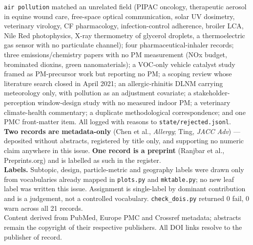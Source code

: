 \documentclass[10pt]{article}
\begin{document}
\begin{keybox}
{\texttt{air pollution} matched an unrelated field (PIPAC oncology, therapeutic aerosol in
equine wound care, free-space optical communication, solar UV dosimetry, veterinary
virology, CF pharmacology, infection-control adherence, broiler LCA, Nile Red photophysics,
X-ray thermometry of glycerol droplets, a thermoelectric gas sensor with no particulate
channel); four pharmaceutical-inhaler records; three emissions/chemistry papers with no PM
measurement (NOx budget, brominated dioxins, green nanomaterials); a VOC-only vehicle
catalyst study framed as PM-precursor work but reporting no PM; a scoping review whose
literature search closed in April 2021; an allergic-rhinitis DLNM carrying meteorology only,
with pollution as an adjustment covariate; a stakeholder-perception window-design study with
no measured indoor PM; a veterinary climate-health commentary; a duplicate methodological
correspondence; and one PMC front-matter item. All logged with reasons to
\texttt{state/rejected.jsonl}.\\[0.8mm]
\textbf{Two records are metadata-only} (Chen et al., \textit{Allergy}; Ting,
\textit{JACC Adv}) --- deposited without abstracts, registered by title only, and supporting
no numeric claim anywhere in this issue. \textbf{One record is a preprint} (Ranjbar et al.,
Preprints.org) and is labelled as such in the register.\\[0.8mm]
\textbf{Labels.} Subtopic, design, particle-metric and geography labels were drawn only from
vocabularies already mapped in \texttt{plots.py} and \texttt{mktable.py}; no new leaf label
was written this issue. Assignment is single-label by dominant contribution and is a
judgement, not a controlled vocabulary. \texttt{check\_dois.py} returned 0 fail, 0 warn
across all 21 records.\\[0.8mm]
Content derived from PubMed, Europe PMC and Crossref metadata; abstracts remain the
copyright of their respective publishers. All DOI links resolve to the publisher of record.\par}
\end{keybox}
\end{document}
